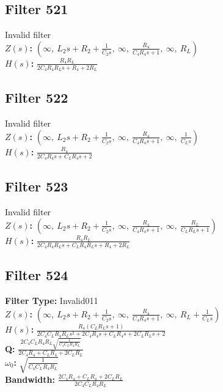 \documentclass{article}
\begin{document}
\subsection*{Filter 521}
Invalid filter \\ 
\textbf{$Z(s)$:} $\left( \infty, \  L_{2} s + R_{2} + \frac{1}{C_{2} s}, \  \infty, \  \frac{R_{4}}{C_{4} R_{4} s + 1}, \  \infty, \  R_{L}\right)$ \\ 
\textbf{$H(s)$:} $\frac{R_{4} R_{L}}{2 C_{4} R_{4} R_{L} s + R_{4} + 2 R_{L}}$ \\ 
\subsection*{Filter 522}
Invalid filter \\ 
\textbf{$Z(s)$:} $\left( \infty, \  L_{2} s + R_{2} + \frac{1}{C_{2} s}, \  \infty, \  \frac{R_{4}}{C_{4} R_{4} s + 1}, \  \infty, \  \frac{1}{C_{L} s}\right)$ \\ 
\textbf{$H(s)$:} $\frac{R_{4}}{2 C_{4} R_{4} s + C_{L} R_{4} s + 2}$ \\ 
\subsection*{Filter 523}
Invalid filter \\ 
\textbf{$Z(s)$:} $\left( \infty, \  L_{2} s + R_{2} + \frac{1}{C_{2} s}, \  \infty, \  \frac{R_{4}}{C_{4} R_{4} s + 1}, \  \infty, \  \frac{R_{L}}{C_{L} R_{L} s + 1}\right)$ \\ 
\textbf{$H(s)$:} $\frac{R_{4} R_{L}}{2 C_{4} R_{4} R_{L} s + C_{L} R_{4} R_{L} s + R_{4} + 2 R_{L}}$ \\ 
\subsection*{Filter 524}
\textbf{Filter Type:} Invalid011 \\ 
\textbf{$Z(s)$:} $\left( \infty, \  L_{2} s + R_{2} + \frac{1}{C_{2} s}, \  \infty, \  \frac{R_{4}}{C_{4} R_{4} s + 1}, \  \infty, \  R_{L} + \frac{1}{C_{L} s}\right)$ \\ 
\textbf{$H(s)$:} $\frac{R_{4} \left(C_{L} R_{L} s + 1\right)}{2 C_{4} C_{L} R_{4} R_{L} s^{2} + 2 C_{4} R_{4} s + C_{L} R_{4} s + 2 C_{L} R_{L} s + 2}$ \\ 
\textbf{Q:} $\frac{2 C_{4} C_{L} R_{4} R_{L} \sqrt{\frac{1}{C_{4} C_{L} R_{4} R_{L}}}}{2 C_{4} R_{4} + C_{L} R_{4} + 2 C_{L} R_{L}}$ \\ 
\textbf{$\omega_0$:} $\sqrt{\frac{1}{C_{4} C_{L} R_{4} R_{L}}}$ \\ 
\textbf{Bandwidth:} $\frac{2 C_{4} R_{4} + C_{L} R_{4} + 2 C_{L} R_{L}}{2 C_{4} C_{L} R_{4} R_{L}}$ \\ 
\end{document}
